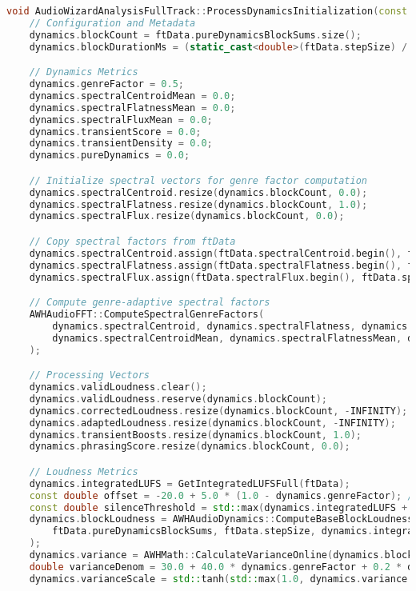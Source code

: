 \documentclass[11pt]{article}
\begin{document}
\begin{lstlisting}[language=C++]
void AudioWizardAnalysisFullTrack::ProcessDynamicsInitialization(const FullTrackData& ftData, FullTrackDataDynamics& dynamics) {
	// Configuration and Metadata
	dynamics.blockCount = ftData.pureDynamicsBlockSums.size();
	dynamics.blockDurationMs = (static_cast<double>(ftData.stepSize) / ftData.sampleRate) * 1000.0;

	// Dynamics Metrics
	dynamics.genreFactor = 0.5;
	dynamics.spectralCentroidMean = 0.0;
	dynamics.spectralFlatnessMean = 0.0;
	dynamics.spectralFluxMean = 0.0;
	dynamics.transientScore = 0.0;
	dynamics.transientDensity = 0.0;
	dynamics.pureDynamics = 0.0;

	// Initialize spectral vectors for genre factor computation
	dynamics.spectralCentroid.resize(dynamics.blockCount, 0.0);
	dynamics.spectralFlatness.resize(dynamics.blockCount, 1.0);
	dynamics.spectralFlux.resize(dynamics.blockCount, 0.0);

	// Copy spectral factors from ftData
	dynamics.spectralCentroid.assign(ftData.spectralCentroid.begin(), ftData.spectralCentroid.begin() + dynamics.blockCount);
	dynamics.spectralFlatness.assign(ftData.spectralFlatness.begin(), ftData.spectralFlatness.begin() + dynamics.blockCount);
	dynamics.spectralFlux.assign(ftData.spectralFlux.begin(), ftData.spectralFlux.begin() + dynamics.blockCount);

	// Compute genre-adaptive spectral factors
	AWHAudioFFT::ComputeSpectralGenreFactors(
		dynamics.spectralCentroid, dynamics.spectralFlatness, dynamics.spectralFlux,
		dynamics.spectralCentroidMean, dynamics.spectralFlatnessMean, dynamics.spectralFluxMean, dynamics.genreFactor
	);

	// Processing Vectors
	dynamics.validLoudness.clear();
	dynamics.validLoudness.reserve(dynamics.blockCount);
	dynamics.correctedLoudness.resize(dynamics.blockCount, -INFINITY);
	dynamics.adaptedLoudness.resize(dynamics.blockCount, -INFINITY);
	dynamics.transientBoosts.resize(dynamics.blockCount, 1.0);
	dynamics.phrasingScore.resize(dynamics.blockCount, 0.0);

	// Loudness Metrics
	dynamics.integratedLUFS = GetIntegratedLUFSFull(ftData);
	const double offset = -20.0 + 5.0 * (1.0 - dynamics.genreFactor); // -20.0 to -17.0
	const double silenceThreshold = std::max(dynamics.integratedLUFS + offset, -70.0);
	dynamics.blockLoudness = AWHAudioDynamics::ComputeBaseBlockLoudness(
		ftData.pureDynamicsBlockSums, ftData.stepSize, dynamics.integratedLUFS, silenceThreshold, &dynamics.validLoudness
	);
	dynamics.variance = AWHMath::CalculateVarianceOnline(dynamics.blockLoudness);
	double varianceDenom = 30.0 + 40.0 * dynamics.genreFactor + 0.2 * dynamics.variance; // 30–70 dB², genre-adjusted
	dynamics.varianceScale = std::tanh(std::max(1.0, dynamics.variance / varianceDenom));


\end{lstlisting}
\end{document}
